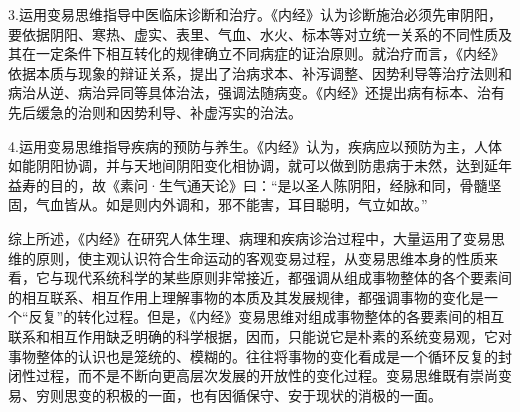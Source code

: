 \documentclass[draft,12pt]{ctexbook}
\begin{document}
3.运用变易思维指导中医临床诊断和治疗。《内经》认为诊断施治必须先审阴阳，要依据阴阳、寒热、虚实、表里、气血、水火、标本等对立统一关系的不同性质及其在一定条件下相互转化的规律确立不同病症的证治原则。就治疗而言，《内经》依据本质与现象的辩证关系，提出了治病求本、补泻调整、因势利导等治疗法则和病治从逆、病治异同等具体治法，强调法随病变。《内经》还提出病有标本、治有先后缓急的治则和因势利导、补虚泻实的治法。

4.运用变易思维指导疾病的预防与养生。《内经》认为，疾病应以预防为主，人体如能阴阳协调，并与天地间阴阳变化相协调，就可以做到防患病于未然，达到延年益寿的目的，故《素问·生气通天论》曰：“是以圣人陈阴阳，经脉和同，骨髓坚固，气血皆从。如是则内外调和，邪不能害，耳目聪明，气立如故。”

综上所述，《内经》在研究人体生理、病理和疾病诊治过程中，大量运用了变易思维的原则，使主观认识符合生命运动的客观变易过程，从变易思维本身的性质来看，它与现代系统科学的某些原则非常接近，都强调从组成事物整体的各个要素间的相互联系、相互作用上理解事物的本质及其发展规律，都强调事物的变化是一个“反复”的转化过程。但是，《内经》变易思维对组成事物整体的各要素间的相互联系和相互作用缺乏明确的科学根据，因而，只能说它是朴素的系统变易观，它对事物整体的认识也是笼统的、模糊的。往往将事物的变化看成是一个循环反复的封闭性过程，而不是不断向更高层次发展的开放性的变化过程。变易思维既有崇尚变易、穷则思变的积极的一面，也有因循保守、安于现状的消极的一面。

\ifx \allfiles \undefined
\end{document}

